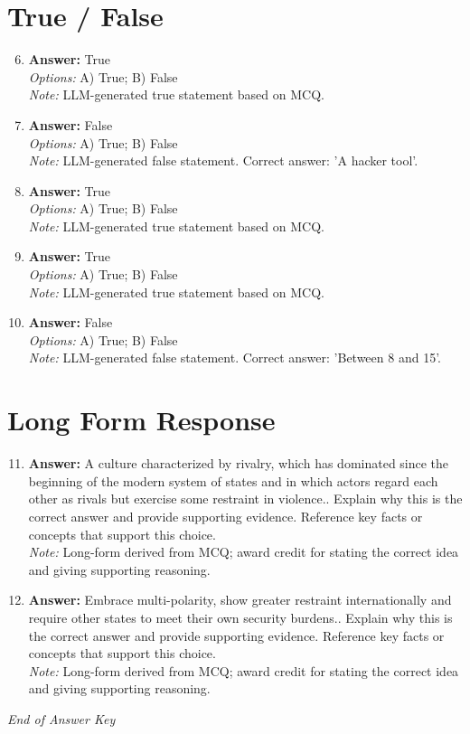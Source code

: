 \documentclass[12pt]{article}
\begin{document}
\section*{True / False}
\begin{enumerate}[label=\arabic*.]
\setcounter{enumi}{5}
\item \textbf{Answer:} True
\\ \textit{Options:} A) True; B) False
\\ \textit{Note:} LLM-generated true statement based on MCQ.
\item \textbf{Answer:} False
\\ \textit{Options:} A) True; B) False
\\ \textit{Note:} LLM-generated false statement. Correct answer: 'A hacker tool'.
\item \textbf{Answer:} True
\\ \textit{Options:} A) True; B) False
\\ \textit{Note:} LLM-generated true statement based on MCQ.
\item \textbf{Answer:} True
\\ \textit{Options:} A) True; B) False
\\ \textit{Note:} LLM-generated true statement based on MCQ.
\item \textbf{Answer:} False
\\ \textit{Options:} A) True; B) False
\\ \textit{Note:} LLM-generated false statement. Correct answer: 'Between 8 and 15'.
\end{enumerate}

\section*{Long Form Response}
\begin{enumerate}[label=\arabic*.]
\setcounter{enumi}{10}
\item \textbf{Answer:} A culture characterized by rivalry, which has dominated since the beginning of the modern system of states and in which actors regard each other as rivals but exercise some restraint in violence.. Explain why this is the correct answer and provide supporting evidence. Reference key facts or concepts that support this choice.
\\ \textit{Note:} Long-form derived from MCQ; award credit for stating the correct idea and giving supporting reasoning.
\item \textbf{Answer:} Embrace multi-polarity, show greater restraint internationally and require other states to meet their own security burdens.. Explain why this is the correct answer and provide supporting evidence. Reference key facts or concepts that support this choice.
\\ \textit{Note:} Long-form derived from MCQ; award credit for stating the correct idea and giving supporting reasoning.
\end{enumerate}

\vfill
\noindent\textit{End of Answer Key}
\end{document}
